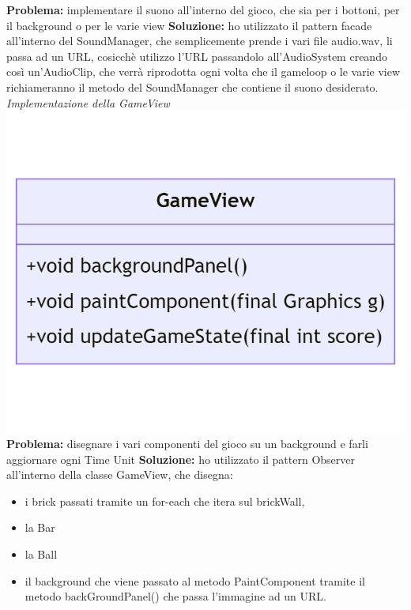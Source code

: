 \documentclass[a4paper,12pt]{report}
\begin{document}
\textbf{Problema:} implementare il suono all'interno del gioco, che sia per i bottoni, per il background o per le varie view
\newline
\newline
\textbf{Soluzione:} ho utilizzato il pattern facade all'interno del SoundManager, che semplicemente prende i vari file audio.wav, li passa ad un URL, cosicchè utilizzo l'URL passandolo all'AudioSystem creando così un'AudioClip, che verrà riprodotta ogni volta che il gameloop o le varie view richiameranno il metodo del SoundManager che contiene il suono desiderato.  
\newline
\newline
\textit{Implementazione della GameView}
\newline
\includegraphics[width=\textwidth]{gameview.png}
\newline
\textbf{Problema:} disegnare i vari componenti del gioco su un background e farli aggiornare ogni Time Unit
\newline
\newline
\textbf{Soluzione:} ho utilizzato il pattern Observer all'interno della classe GameView, che disegna:
\begin{itemize}
    \item i brick passati tramite un for-each che itera sul brickWall, 
    \item la Bar
    \item la Ball
    \item il background che viene passato al metodo PaintComponent tramite il metodo backGroundPanel() che passa l'immagine ad un URL.
\end{itemize}
\end{document}
